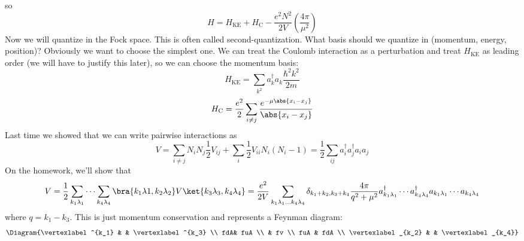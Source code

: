 \documentclass[a4paper,twoside,master.tex]{subfiles}
\begin{document}
so
\begin{equation}
    H = H_{\text{KE}} + H_{\text{C}} - \frac{e^2 N^2}{2V} \left( \frac{4 \pi}{\mu^2} \right)
\end{equation}
Now we will quantize in the Fock space. This is often called second-quantization. What basis should we quantize in (momentum, energy, position)? Obviously we want to choose the simplest one. We can treat the Coulomb interaction as a perturbation and treat $ H_{\text{KE}} $ as leading order (we will have to justify this later), so we can choose the momentum basis:
\begin{equation}
    H_{\text{KE}} = \sum_{k^2} a_k^\dagger a_k \frac{\hbar^2 k^2}{2m}
\end{equation}
\begin{equation}
    H_{\text{C}} = \frac{e^2}{2} \sum_{i \neq j} \frac{e^{- \mu \abs{x_i - x_j}}}{\abs{x_i - x_j}}
\end{equation}
Last time we showed that we can write pairwise interactions as
\begin{equation}
    V = \sum_{i \neq j} N_i N_j \frac{1}{2} V_{ij} + \sum_i \frac{1}{2} V_{ii} N_i (N_i - 1) = \frac{1}{2} \sum_{ij} a_i^\dagger a_j^\dagger a_i a_j
\end{equation}
On the homework, we'll show that
\begin{equation}
    V = \frac{1}{2} \sum_{k_1 \lambda_1} \cdots \sum_{k_4 \lambda_4}\bra{k_1 \lambda 1, k_2 \lambda_2} V\ket{k_3 \lambda_3, k_4 \lambda_4} = \frac{e^2}{2V} \sum_{k_1 \lambda_1 \ldots k_4 \lambda_4} \delta_{k_1 + k_2, k_3 + k_4} \frac{4 \pi}{q^2 + \mu^2} a^\dagger_{k_1 \lambda_1} \cdots a^\dagger_{k_4 \lambda_4} a_{k_1 \lambda_1} \cdots a_{k_4 \lambda_4}
\end{equation}
where $ q = k_1 - k_3 $. This is just momentum conservation and represents a Feynman diagram:
\begin{equation}
    \Diagram{\vertexlabel^{k_1} & & \vertexlabel^{k_3} \\
        fdA& fuA \\
        & fv \\
    fuA & fdA \\
\vertexlabel_{k_2} & & \vertexlabel_{k_4}}
\end{equation}
\end{document}
